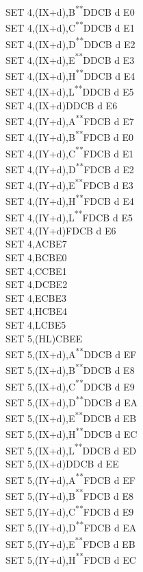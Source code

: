 \documentclass[twoside,openright,a4paper]{book}
\newcommand{\UNDOC}{\textnormal{\textsuperscript{**}}}
\begin{document}
\begin{multicols}{3}
{\begin{tabbing}
	SET 4,(IX+d),B\UNDOC\>DDCB d E0\\
	SET 4,(IX+d),C\UNDOC\>DDCB d E1\\
	SET 4,(IX+d),D\UNDOC\>DDCB d E2\\
	SET 4,(IX+d),E\UNDOC\>DDCB d E3\\
	SET 4,(IX+d),H\UNDOC\>DDCB d E4\\
	SET 4,(IX+d),L\UNDOC\>DDCB d E5\\
	SET 4,(IX+d)\>DDCB d E6\\
	SET 4,(IY+d),A\UNDOC\>FDCB d E7\\
	SET 4,(IY+d),B\UNDOC\>FDCB d E0\\
	SET 4,(IY+d),C\UNDOC\>FDCB d E1\\
	SET 4,(IY+d),D\UNDOC\>FDCB d E2\\
	SET 4,(IY+d),E\UNDOC\>FDCB d E3\\
	SET 4,(IY+d),H\UNDOC\>FDCB d E4\\
	SET 4,(IY+d),L\UNDOC\>FDCB d E5\\
	SET 4,(IY+d)\>FDCB d E6\\
	SET 4,A\>CBE7\\
	SET 4,B\>CBE0\\
	SET 4,C\>CBE1\\
	SET 4,D\>CBE2\\
	SET 4,E\>CBE3\\
	SET 4,H\>CBE4\\
	SET 4,L\>CBE5\\
	SET 5,(HL)\>CBEE\\
	SET 5,(IX+d),A\UNDOC\>DDCB d EF\\
	SET 5,(IX+d),B\UNDOC\>DDCB d E8\\
	SET 5,(IX+d),C\UNDOC\>DDCB d E9\\
	SET 5,(IX+d),D\UNDOC\>DDCB d EA\\
	SET 5,(IX+d),E\UNDOC\>DDCB d EB\\
	SET 5,(IX+d),H\UNDOC\>DDCB d EC\\
	SET 5,(IX+d),L\UNDOC\>DDCB d ED\\
	SET 5,(IX+d)\>DDCB d EE\\
	SET 5,(IY+d),A\UNDOC\>FDCB d EF\\
	SET 5,(IY+d),B\UNDOC\>FDCB d E8\\
	SET 5,(IY+d),C\UNDOC\>FDCB d E9\\
	SET 5,(IY+d),D\UNDOC\>FDCB d EA\\
	SET 5,(IY+d),E\UNDOC\>FDCB d EB\\
	SET 5,(IY+d),H\UNDOC\>FDCB d EC\\

\end{tabbing}}
\end{multicols}
\end{document}
